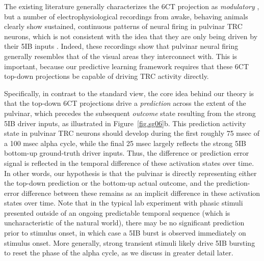 \documentclass[11pt,twoside]{article}
\newif\myifpdf
\begin{document}
The existing literature generally characterizes the 6CT projection as \emph{modulatory} \cite{ShermanGuillery13,UsreySherman18}, but a number of electrophysiological recordings from awake, behaving animals clearly show sustained, continuous patterns of neural firing in pulvinar TRC neurons, which is not consistent with the idea that they are only being driven by their 5IB inputs \cite{Bender82,PetersenRobinsonKeys85,BenderYouakim01,Robinson93,SaalmannPinskWangEtAl12,KomuraNikkuniHirashimaEtAl13,ZhouSchaferDesimone16}.  Indeed, these recordings show that pulvinar neural firing generally resembles that of the visual areas they interconnect with.  This is important, because our predictive learning framework requires that these 6CT top-down projections be capable of driving TRC activity directly.

Specifically, in contrast to the standard view, the core idea behind our theory is that the top-down 6CT projections drive a \emph{prediction} across the extent of the pulvinar, which precedes the subsequent \emph{outcome} state resulting from the strong 5IB driver inputs, as illustrated in Figure~\ref{fig.sg06}b.  This prediction activity state in pulvinar TRC neurons should develop during the first roughly 75 msec of a 100 msec alpha cycle, while the final 25 msec largely reflects the strong 5IB bottom-up ground-truth driver inputs.  Thus, the difference or prediction error signal is reflected in the temporal difference of these activation states over time.  In other words, our hypothesis is that the pulvinar is directly representing either the top-down prediction or the bottom-up actual outcome, and the prediction-error difference between these remains as an implicit difference in these activation states over time.  Note that in the typical lab experiment with phasic stimuli presented outside of an ongoing predictable temporal sequence (which is uncharacteristic of the natural world), there may be no significant prediction prior to stimulus onset, in which case a 5IB burst is observed immediately on stimulus onset.  More generally, strong transient stimuli likely drive 5IB bursting to reset the phase of the alpha cycle, as we discuss in greater detail later.
\end{document}
